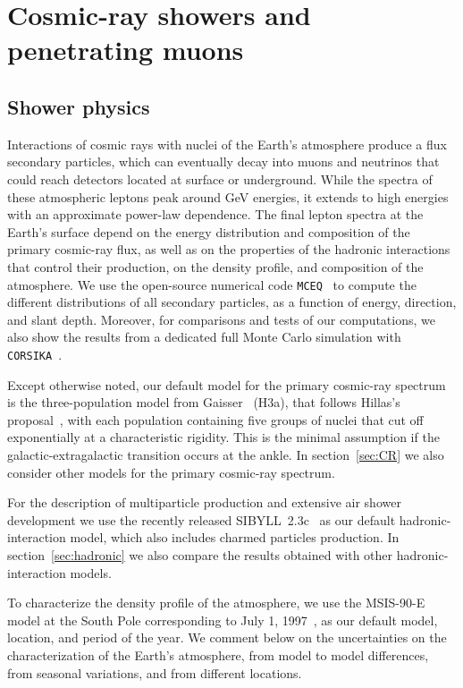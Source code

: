 \documentclass[aps,prd,showpacs,letterpaper,onecolumn,longbibliography,superscriptaddress,notitlepage,nofootinbib]{revtex4-1}%
\newcommand{\MCEq}{\texttt{MCE{\scriptsize Q}}}
\newcommand{\CORSIKA}{\texttt{CORSIKA}}
\begin{document}
\section{Cosmic-ray showers and penetrating muons}
\label{sec:shower-muons}

\subsection{Shower physics}
\label{sec:shower_physics}

Interactions of cosmic rays with nuclei of the Earth's atmosphere produce a flux secondary particles, which can eventually decay into muons and neutrinos that could reach detectors located at surface or underground. While the spectra of these atmospheric leptons peak around GeV energies, it extends to high energies with an approximate power-law dependence. The final lepton spectra at the Earth's surface depend on the energy distribution and composition of the primary cosmic-ray flux, as well as on the properties of the hadronic interactions that control their production, on the density profile, and composition of the atmosphere. We use the open-source numerical code \MCEq~\cite{MCEq, Fedynitch:2015zma, Fedynitch:2018vfe} to compute the different distributions of all secondary particles, as a function of energy, direction, and slant depth. Moreover, for comparisons and tests of our computations, we also show the results from a dedicated full Monte Carlo simulation with \CORSIKA~\cite{Heck:1998vt, Heck:2018}.

Except otherwise noted, our default model for the primary cosmic-ray spectrum is the three-population model from Gaisser~\cite{Gaisser:2011cc} (H3a), that follows Hillas's proposal~\cite{Hillas:2006ms}, with each population containing five groups of nuclei that cut off exponentially at a characteristic rigidity. This is the minimal assumption if the galactic-extragalactic transition occurs at the ankle. In section~\ref{sec:CR} we also consider other models for the primary cosmic-ray spectrum.

For the description of multiparticle production and extensive air shower development we use the recently released SIBYLL~2.3c~\cite{Riehn:2017mfm} as our default hadronic-interaction model, which also includes charmed particles production. In section~\ref{sec:hadronic} we also compare the results obtained with other hadronic-interaction models.

To characterize the density profile of the atmosphere, we use the MSIS-90-E model at the South Pole corresponding to July 1, 1997~\cite{Labitzke:1985, Hedin:1991}, as our default model, location, and period of the year. We comment below on the uncertainties on the characterization of the Earth's atmosphere, from model to model differences, from seasonal variations, and from different locations.
\end{document}
